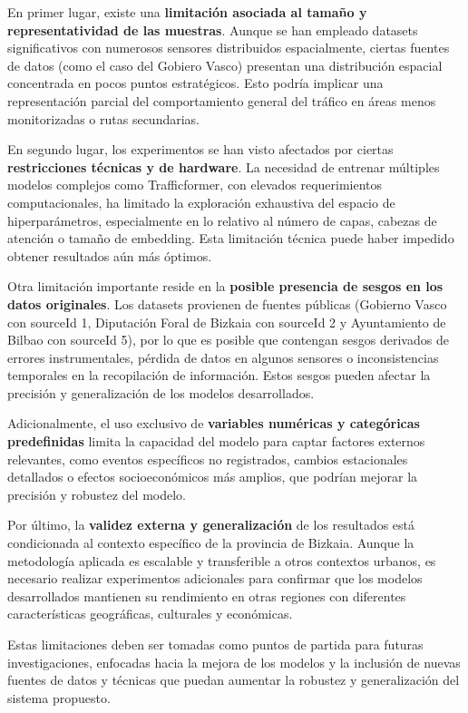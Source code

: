 En primer lugar, existe una \textbf{limitación asociada al tamaño y representatividad de las muestras}. Aunque se han empleado datasets significativos con numerosos sensores distribuidos espacialmente, ciertas fuentes de datos (como el caso del Gobiero Vasco) presentan una distribución espacial concentrada en pocos puntos estratégicos. Esto podría implicar una representación parcial del comportamiento general del tráfico en áreas menos monitorizadas o rutas secundarias.

En segundo lugar, los experimentos se han visto afectados por ciertas \textbf{restricciones técnicas y de hardware}. La necesidad de entrenar múltiples modelos complejos como Trafficformer, con elevados requerimientos computacionales, ha limitado la exploración exhaustiva del espacio de hiperparámetros, especialmente en lo relativo al número de capas, cabezas de atención o tamaño de embedding. Esta limitación técnica puede haber impedido obtener resultados aún más óptimos.

Otra limitación importante reside en la \textbf{posible presencia de sesgos en los datos originales}. Los datasets provienen de fuentes públicas (Gobierno Vasco con sourceId 1, Diputación Foral de Bizkaia con sourceId 2 y Ayuntamiento de Bilbao con sourceId 5), por lo que es posible que contengan sesgos derivados de errores instrumentales, pérdida de datos en algunos sensores o inconsistencias temporales en la recopilación de información. Estos sesgos pueden afectar la precisión y generalización de los modelos desarrollados.

Adicionalmente, el uso exclusivo de \textbf{variables numéricas y categóricas predefinidas} limita la capacidad del modelo para captar factores externos relevantes, como eventos específicos no registrados, cambios estacionales detallados o efectos socioeconómicos más amplios, que podrían mejorar la precisión y robustez del modelo.

Por último, la \textbf{validez externa y generalización} de los resultados está condicionada al contexto específico de la provincia de Bizkaia. Aunque la metodología aplicada es escalable y transferible a otros contextos urbanos, es necesario realizar experimentos adicionales para confirmar que los modelos desarrollados mantienen su rendimiento en otras regiones con diferentes características geográficas, culturales y económicas.

Estas limitaciones deben ser tomadas como puntos de partida para futuras investigaciones, enfocadas hacia la mejora de los modelos y la inclusión de nuevas fuentes de datos y técnicas que puedan aumentar la robustez y generalización del sistema propuesto.

